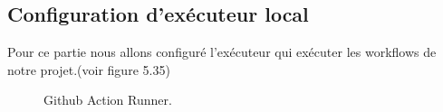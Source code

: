 \subsection{\selectfont\Large  Configuration d'exécuteur local }
\textsf{\selectfont{} Pour ce partie nous allons configuré l'exécuteur qui exécuter les workflows de notre projet.(voir figure 5.35)}
\begin{figure}[H]
    \begin{center}
    \end{center}
    \caption{Github Action Runner.}
   \end{figure}
